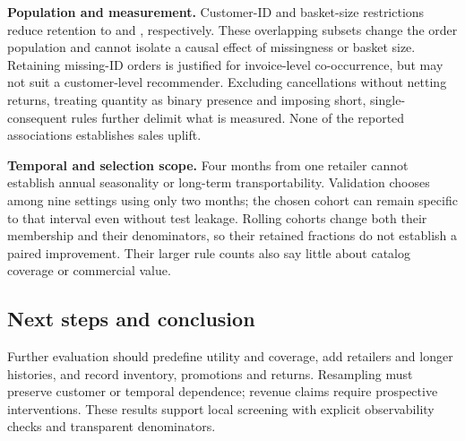 \textbf{Population and measurement.} Customer-ID and basket-size restrictions reduce retention to \KnownRetention{} and \SmallBasketRetention{}, respectively. These overlapping subsets change the order population and cannot isolate a causal effect of missingness or basket size. Retaining missing-ID orders is justified for invoice-level co-occurrence, but may not suit a customer-level recommender. Excluding cancellations without netting returns, treating quantity as binary presence and imposing short, single-consequent rules further delimit what is measured. None of the reported associations establishes sales uplift.

\textbf{Temporal and selection scope.} Four months from one retailer cannot establish annual seasonality or long-term transportability. Validation chooses among nine settings using only two months; the chosen cohort can remain specific to that interval even without test leakage. Rolling cohorts change both their membership and their denominators, so their retained fractions do not establish a paired improvement. Their larger rule counts also say little about catalog coverage or commercial value.

\subsection{Next steps and conclusion}
Further evaluation should predefine utility and coverage, add retailers and longer histories, and record inventory, promotions and returns. Resampling must preserve customer or temporal dependence; revenue claims require prospective interventions. These results support local screening with explicit observability checks and transparent denominators.
\label{maintextend}
